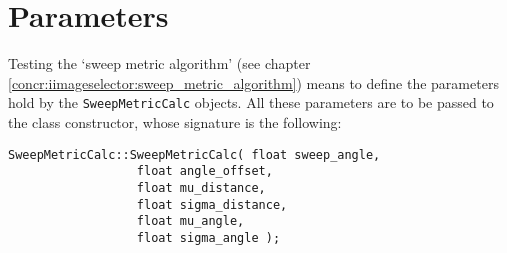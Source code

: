 \section{Parameters}
\label{performance_evaluation:parameters}

Testing the `sweep metric algorithm' (see chapter
\ref{concr:iimageselector:sweep_metric_algorithm}) means to define
the parameters hold by the \texttt{SweepMetricCalc}
objects. All these parameters are 
to be passed to the class constructor, whose signature
is the following:

\begin{lstlisting}[caption={\texttt{SweepMetricCalc} class declaration}, label={code:sweepmetriccalc}, frame=trBL]
SweepMetricCalc::SweepMetricCalc( float sweep_angle,
				  float angle_offset,
				  float mu_distance,
				  float sigma_distance,
				  float mu_angle,
				  float sigma_angle );				  
\end{lstlisting}


